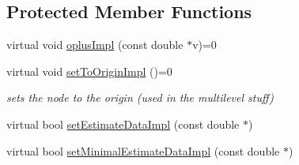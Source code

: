 \subsection*{Protected Member Functions}
\begin{DoxyCompactItemize}
\item 
virtual void \mbox{\hyperlink{classg2o_1_1_optimizable_graph_1_1_vertex_a4537a46afb8d12c3f18c88ba9601c625}{oplus\+Impl}} (const double $\ast$v)=0
\item 
virtual void \mbox{\hyperlink{classg2o_1_1_optimizable_graph_1_1_vertex_abd5fe36815f27a9c174ad41c2070c247}{set\+To\+Origin\+Impl}} ()=0
\begin{DoxyCompactList}\small\item\em sets the node to the origin (used in the multilevel stuff) \end{DoxyCompactList}\item 
virtual bool \mbox{\hyperlink{classg2o_1_1_optimizable_graph_1_1_vertex_a35ab439967fd3a3d3e5608e3883d8487}{set\+Estimate\+Data\+Impl}} (const double $\ast$)
\item 
virtual bool \mbox{\hyperlink{classg2o_1_1_optimizable_graph_1_1_vertex_a088ecbdde86968f3896b2320f80ee396}{set\+Minimal\+Estimate\+Data\+Impl}} (const double $\ast$)
\end{DoxyCompactItemize}
